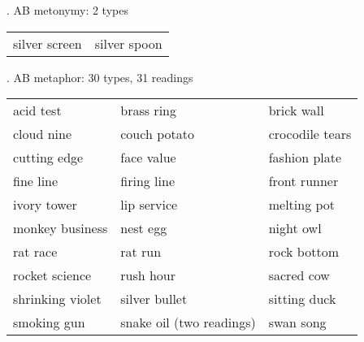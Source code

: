 \ex. AB metonymy: 2 types\\  \nopagebreak[4]
\begin{tabular}[h]{ll}
  silver screen&silver spoon
\end{tabular}

\pagebreak[4]
\ex. AB metaphor: 30 types, 31 readings\\
\begin{tabular}[h]{lll}
acid test&brass ring          &brick wall\\
cloud nine&couch potato&crocodile tears  \\
cutting edge                    &face value&fashion plate\\          
fine line                       &firing line&front runner          \\        
ivory tower &lip service         &           melting pot\\
monkey business&nest egg&night owl\\    
rat race &rat run           &rock bottom \\
rocket science                  &rush hour&sacred cow  \\
shrinking violet&     silver bullet                           &sitting duck  \\  
smoking gun                     &snake oil (two readings)          &    swan song   \\           
  \end{tabular}



